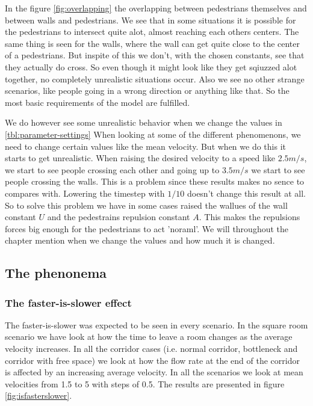 In the figure \ref{fig:overlapping} the overlapping between pedestrians 
themselves and between walls and pedestrians. We see that in some situations 
it is possible for the pedestrians to intersect quite alot, almost reaching 
each others centers. The same thing is seen for the walls, where the wall 
can get quite close to the center of a pedestrians. But inspite of this 
we don't, with the chosen constants, see that they actually do cross. So 
even though it might look like they get sqiuzzed alot together, no completely 
unrealistic situations occur. Also we see no other strange scenarios, like 
people going in a wrong direction or anything like that. So the most basic 
requirements of the model are fulfilled. 

We do however see some unrealistic behavior when we change the values in 
\ref{tbl:parameter-settings} When looking at some of the different phenomenons, 
we need to change certain values like the mean velocity. But when we do 
this it starts to get unrealistic. When raising the desired velocity to 
a speed like $2.5m/s$, we start to see people crossing each other and going 
up to $3.5m/s$ we start to see people crossing the walls. This is a problem 
since these results makes no sence to compares with. Lowering the timestep 
with $1/10$ doesn't change this result at all. So to solve this problem we 
have in some cases raised the wallues of the wall constant $U$ and the 
pedestrains repulsion constant $A$. This makes the repulsions forces 
big enough for the pedestrians to act 'noraml'. We will throughout the 
chapter mention when we change the values and how much it is changed.

\subsection{The phenonema}

\subsubsection{The faster-is-slower effect}
The faster-is-slower was expected to be seen in every scenario.
In the square room scenario we have look at how the time to leave 
a room changes as the average velocity increases. In all the corridor 
cases (i.e. normal corridor, bottleneck and corridor with free space) 
we look at how the flow rate at the end of the corridor is 
affected by an increasing average velocity. In all the scenarios 
we look at mean velocities from 1.5 to 5 with steps of 0.5. The 
results are presented in figure \ref{fig:isfasterslower}.

